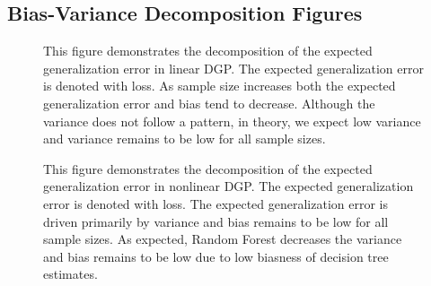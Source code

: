 \subsection{Bias-Variance Decomposition Figures}
\begin{figure}[H]
	\centering
	\captionsetup{format=plain}
	\caption{This figure demonstrates the decomposition of the expected generalization error in linear DGP. 
			The expected generalization error is denoted with loss. 
			As sample size increases both the expected generalization error and bias tend to decrease. 
			Although the variance does not follow a pattern, in theory, we expect low variance and 
			variance remains to be low for all sample sizes.}
	\label{fig:bias_var_linear}
\end{figure}

\begin{figure}[H]
	\centering
	\captionsetup{format=plain}
	\caption{This figure demonstrates the decomposition of the expected generalization error in nonlinear DGP. 
			The expected generalization error is denoted with loss. 
			The expected generalization error is driven primarily 
			by variance and bias remains to be low for all sample sizes. 
			As expected, Random Forest decreases the variance and bias remains to be low due to low biasness of decision tree estimates.}
	\label{fig:bias_var_nonlinear}
\end{figure}



